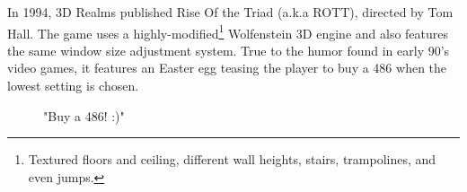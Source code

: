    \begin{figure}[H]
\centering
 \end{figure}
 \par

   \begin{figure}[H]
\centering
 \end{figure}
 \par
{} In 1994, 3D Realms published Rise Of the Triad (a.k.a ROTT), directed by Tom Hall. The game uses a highly-modified\footnote{Textured floors and ceiling, different wall heights, stairs, trampolines, and even jumps.} Wolfenstein 3D engine and also features the same window size adjustment system. True to the humor found in early 90's video games, it features an Easter egg teasing the player to buy a 486 when the lowest setting is chosen.
    \begin{figure}[H]
\centering
 \caption{"Buy a 486! :)"}
 \end{figure}
 \par
